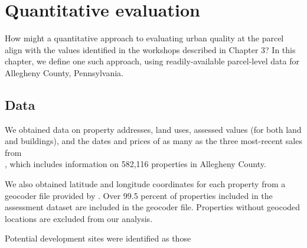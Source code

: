 \documentclass[
]{book}
\begin{document}
\hypertarget{quantitative-evaluation}{%
\chapter{Quantitative evaluation}\label{quantitative-evaluation}}

How might a quantitative approach to evaluating urban quality at the parcel
align with the values identified in the workshops described in Chapter 3? In
this chapter, we define one such approach, using readily-available parcel-level
data for Allegheny County, Pennsylvania.

\hypertarget{data}{%
\section{Data}\label{data}}

We obtained data on property addresses, land uses, assessed values (for both
land and buildings), and the dates and prices of as many as the three
most-recent sales from\\
\citet{allegheny_county_office_of_property_assessments_allegheny_2022}, which
includes information on 582,116 properties in Allegheny County.

We also obtained latitude and longitude coordinates for each property from a
geocoder file provided by \citet{western_pennsylvania_regional_data_center_geocoders_2021}.
Over 99.5 percent of properties included in the assessment dataset are included
in the geocoder file. Properties without geocoded locations are excluded from
our analysis.

Potential development sites were identified as those
\end{document}
